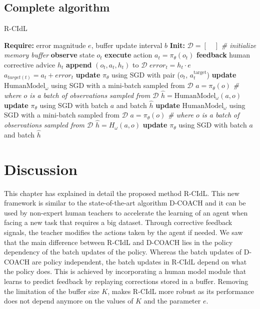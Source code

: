 \subsection*{Complete algorithm}

\begin{algorithm}[H]
\caption{R-CIdL}\label{algorithm:R-CIdL}
\begin{algorithmic}[1]
\State \textbf{Require:} error magnitude $e$, buffer update interval $b$
\State \textbf{Init:} $\mathcal{D} = [\quad]$  \emph{\# initialize memory buffer}
\State \textbf{observe} state $o_{t}$
\State \textbf{execute} action $a_{t}=\pi_{\theta}(o_{t})$
\State \textbf{feedback} human corrective advice $h_{t}$
\State \textbf{append} $(o_{t}, a_{t}, h_{t})$ to $\mathcal{D}$
\State $\mathit{error}_{t} = h_{t}\cdot e$
\State $a_{target(t)} = a_{t} + \mathit{error}_{t}$
\State \textbf{update} $\pi_\theta$ using SGD with pair ($o_{t}$, $a^{\text{target}}_{t}$)
\State \textbf{update} $\text{HumanModel}_\omega$ using SGD with a mini-batch sampled from $\mathcal{D}$
\State  $a=\pi_{\theta}(o)$ \emph{\# where $o$ is a batch of observations sampled from $\mathcal{D}$}
\State  $\hat{h}=\text{HumanModel}_\omega(a, o)$
\State \textbf{update} $\pi_\theta$ using SGD with batch $a$ and batch $\hat{h}$
\EndIf
{}
\State \textbf{update} $\text{HumanModel}_\omega$ using SGD with a mini-batch sampled from $\mathcal{D}$
\State  $a=\pi_{\theta}(o)$ \emph{\# where $o$ is a batch of observations sampled from $\mathcal{D}$}
\State  $\hat{h}=H_\omega(a, o)$
\State \textbf{update} $\pi_{\theta}$ using SGD with batch $a$ and batch $\hat{h}$
\EndIf
\EndFor
\end{algorithmic}
\label{al:D-COACH with HM}
\end{algorithm}











\section{Discussion}
\label{section:Algorithm-Discussion}
This chapter has explained in detail the proposed method R-CIdL. This new framework is similar to the state-of-the-art algorithm D-COACH and it can be used by non-expert human teachers to accelerate the learning of an agent when facing a new task that requires a big dataset. Through corrective feedback signals, the teacher modifies the actions taken by the agent if needed. We saw that the main difference between R-CIdL and D-COACH lies in the policy dependency of the batch updates of the policy. Whereas the batch updates of D-COACH are policy independent, the batch updates in R-CIdL depend on what the policy does. This is achieved by incorporating a human model module that learns to predict feedback by replaying corrections stored in a buffer. Removing the limitation of the buffer size $K$, makes R-CIdL more robust as its performance does not depend anymore on the values of $K$ and the parameter $e$.

